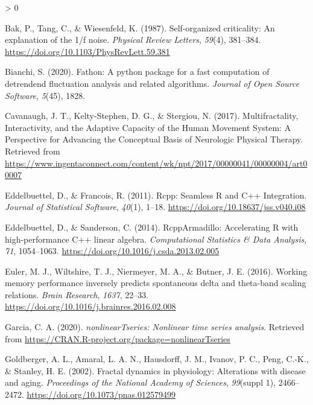 \documentclass[
  english,
  man]{apa6}
\newlength{\cslhangindent}
\newenvironment{CSLReferences}[2] %
 {%
  \setlength{\parindent}{0pt}
  \ifodd #1 \everypar{\setlength{\hangindent}{\cslhangindent}}\ignorespaces\fi
  \ifnum #2 > 0
  \setlength{\parskip}{#2\baselineskip}
  \fi
 }%
 {}
\begin{document}
\hypertarget{refs}{}
\begin{CSLReferences}{1}{0}
\leavevmode\hypertarget{ref-bak1987}{}%
Bak, P., Tang, C., \& Wiesenfeld, K. (1987). Self-organized criticality: An explanation of the 1/f noise. \emph{Physical Review Letters}, \emph{59}(4), 381--384. \url{https://doi.org/10.1103/PhysRevLett.59.381}

\leavevmode\hypertarget{ref-bianchi2020}{}%
Bianchi, S. (2020). Fathon: A python package for a fast computation of detrendend fluctuation analysis and related algorithms. \emph{Journal of Open Source Software}, \emph{5}(45), 1828.

\leavevmode\hypertarget{ref-cavanaugh2017}{}%
Cavanaugh, J. T., Kelty-Stephen, D. G., \& Stergiou, N. (2017). Multifractality, Interactivity, and the Adaptive Capacity of the Human Movement System: A Perspective for Advancing the Conceptual Basis of Neurologic Physical Therapy. Retrieved from \url{https://www.ingentaconnect.com/content/wk/npt/2017/00000041/00000004/art00007}

\leavevmode\hypertarget{ref-eddelbuettel2011}{}%
Eddelbuettel, D., \& Francois, R. (2011). Rcpp: Seamless R and C++ Integration. \emph{Journal of Statistical Software}, \emph{40}(1), 1--18. \url{https://doi.org/10.18637/jss.v040.i08}

\leavevmode\hypertarget{ref-eddelbuettel2014}{}%
Eddelbuettel, D., \& Sanderson, C. (2014). RcppArmadillo: Accelerating R with high-performance C++ linear algebra. \emph{Computational Statistics \& Data Analysis}, \emph{71}, 1054--1063. \url{https://doi.org/10.1016/j.csda.2013.02.005}

\leavevmode\hypertarget{ref-euler2016}{}%
Euler, M. J., Wiltshire, T. J., Niermeyer, M. A., \& Butner, J. E. (2016). Working memory performance inversely predicts spontaneous delta and theta-band scaling relations. \emph{Brain Research}, \emph{1637}, 22--33. \url{https://doi.org/10.1016/j.brainres.2016.02.008}

\leavevmode\hypertarget{ref-garcia2020}{}%
Garcia, C. A. (2020). \emph{nonlinearTseries: Nonlinear time series analysis}. Retrieved from \url{https://CRAN.R-project.org/package=nonlinearTseries}

\leavevmode\hypertarget{ref-goldberger2002}{}%
Goldberger, A. L., Amaral, L. A. N., Hausdorff, J. M., Ivanov, P. C., Peng, C.-K., \& Stanley, H. E. (2002). Fractal dynamics in physiology: Alterations with disease and aging. \emph{Proceedings of the National Academy of Sciences}, \emph{99}(suppl 1), 2466--2472. \url{https://doi.org/10.1073/pnas.012579499}


\end{CSLReferences}
\end{document}
